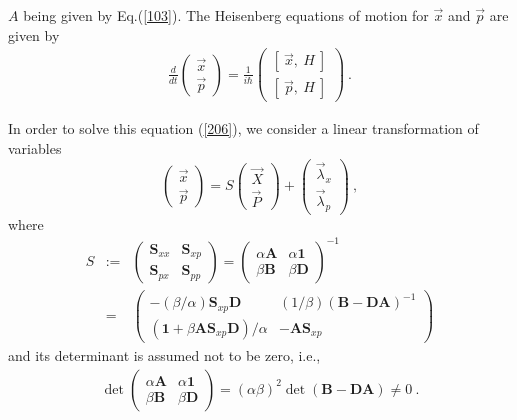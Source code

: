 \documentclass[a4paper,seceq]{ptptex}
\newcommand{\bfA}{ \boldsymbol{A} }
\newcommand{\bfB}{ \boldsymbol{B} }
\newcommand{\bfD}{ \boldsymbol{D} }
\newcommand{\bfS}{ \boldsymbol{S} }
\newcommand{\vecp}{ {\vec p} }
\newcommand{\vecx}{ {\vec x} }
\newcommand{\vecP}{ {\vec P} }
\newcommand{\vecX}{ {\vec X} }
\newcommand{\veclam}{ {\vec \lambda} }
\newcommand{\DEF}{:=}
\begin{document}
$A$ being given by Eq.(\ref{103}).
The Heisenberg equations of motion for $\vec{x}$ and $\vec{p}$
are given by
\begin{eqnarray}
   \frac{d}{dt} \begin{pmatrix} \vecx \\ \vecp \end{pmatrix}
  = \frac{1}{i \hbar}
      \begin{pmatrix} \left[~\vecx,~H~\right] \\
                      \left[~\vecp,~H~\right] \end{pmatrix}~.
\label{206}
\end{eqnarray}

\indent
In order to solve this equation (\ref{206}),
we consider a linear transformation of variables
\begin{equation}
  \begin{pmatrix} \vecx \\ \vecp \end{pmatrix}
    =  S \begin{pmatrix} \vecX \\ \vecP \end{pmatrix}
         + \begin{pmatrix} \veclam_x \\ \veclam_p \end{pmatrix}~,
\label{207}
\end{equation}
where
\begin{eqnarray}
 S &\DEF& \begin{pmatrix} \bfS_{xx} & \bfS_{xp} \\
                          \bfS_{px} & \bfS_{pp} \end{pmatrix}
 = \begin{pmatrix} \alpha \bfA & \alpha \boldsymbol{1} \\
                    \beta \bfB & \beta \bfD \end{pmatrix}^{-1}
 \nonumber \\
  &=& \begin{pmatrix}
       -(\beta/\alpha) \bfS_{xp} \bfD
                 & (1/\beta) \left( \bfB - \bfD \bfA \right)^{-1} \\
       \left( \boldsymbol{1} + \beta \bfA \bfS_{xp} \bfD \right)/\alpha
                 & - \bfA \bfS_{xp} \end{pmatrix}
\label{208}
\end{eqnarray}
and its determinant is assumed not to be zero, i.e.,
\begin{eqnarray}
 \det \begin{pmatrix} \alpha \bfA & \alpha \boldsymbol{1} \\
                       \beta \bfB & \beta \bfD \end{pmatrix}
    = ( \alpha \beta )^2 \det\left( \bfB - \bfD \bfA \right) \neq 0~.
\label{209}
\end{eqnarray}
\end{document}
